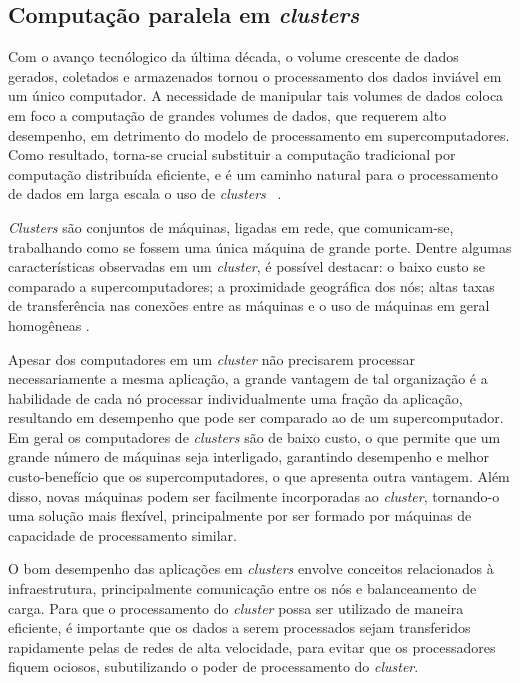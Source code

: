 \subsection{Computação paralela em \textit{clusters}}
Com o avanço tecnólogico da última década, o volume crescente de dados gerados, coletados e armazenados tornou o processamento dos dados inviável em um único computador.
A necessidade de manipular tais volumes de dados coloca em foco a computação de grandes volumes de dados, que requerem alto desempenho, em detrimento do modelo de processamento em supercomputadores.  Como resultado, torna-se crucial substituir a computação tradicional por computação distribuída eficiente, e é um caminho natural para o processamento de dados em larga escala o uso de \textit{clusters} ~\cite{Lin:2010}.

\textit{Clusters} são conjuntos de máquinas, ligadas em rede, que comunicam-se, trabalhando como se fossem uma única máquina de grande porte. 
Dentre algumas características observadas em um \textit{cluster}, é possível destacar: o baixo custo se comparado a supercomputadores; a proximidade geográfica dos nós; altas taxas de transferência nas conexões entre as máquinas e o uso de máquinas em geral homogêneas \cite{Toth:2008}.

Apesar dos computadores em um \textit{cluster} não precisarem processar necessariamente a mesma aplicação, a grande vantagem de tal organização é a habilidade de cada nó processar individualmente uma fração da aplicação, resultando em desempenho que pode ser comparado ao de um supercomputador.
Em geral os computadores de \textit{clusters} são de baixo custo, o que permite que um grande número de máquinas seja interligado, garantindo desempenho e melhor custo-benefício que os supercomputadores, o que apresenta outra vantagem. Além disso, novas máquinas podem ser facilmente incorporadas  ao \textit{cluster}, tornando-o uma solução mais flexível, principalmente por ser formado por máquinas de capacidade de processamento similar.

O bom desempenho das aplicações em \textit{clusters} envolve conceitos relacionados à infraestrutura, principalmente comunicação entre os nós e balanceamento de carga.
Para que o processamento do \textit{cluster} possa ser utilizado de maneira eficiente, é importante que os dados a serem processados sejam transferidos rapidamente pelas de redes de alta velocidade, para evitar que os processadores fiquem ociosos, subutilizando o poder de processamento do \textit{cluster}\cite{Rauber:2010}. 


